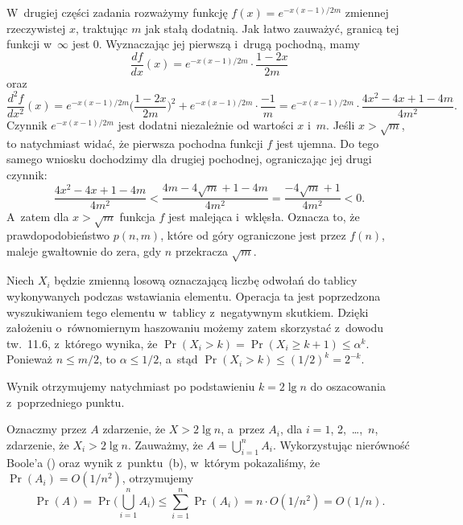 W~drugiej części zadania rozważymy funkcję $f(x)=e^{-x(x-1)/2m}$ zmiennej rzeczywistej $x$, traktując $m$ jak stałą dodatnią.
Jak łatwo zauważyć, granicą tej funkcji w~$\infty$ jest 0.
Wyznaczając jej pierwszą i~drugą pochodną, mamy
\[
	\frac{df}{dx}(x) = e^{-x(x-1)/2m}\cdot\frac{1-2x}{2m}
\]
oraz
\[
	\frac{d^2\!f}{dx^2}(x) = e^{-x(x-1)/2m}\biggl(\frac{1-2x}{2m}\biggr)^2+e^{-x(x-1)/2m}\cdot\frac{-1}{m} = e^{-x(x-1)/2m}\cdot\frac{4x^2-4x+1-4m}{4m^2}.
\]
Czynnik $e^{-x(x-1)/2m}$ jest dodatni niezależnie od wartości $x$ i~$m$.
Jeśli $x>\sqrt{m}$, to natychmiast widać, że pierwsza pochodna funkcji $f$ jest ujemna.
Do tego samego wniosku dochodzimy dla drugiej pochodnej, ograniczając jej drugi czynnik:
\[
	\frac{4x^2-4x+1-4m}{4m^2} < \frac{4m-4\sqrt{m}+1-4m}{4m^2} = \frac{-4\sqrt{m}+1}{4m^2} < 0.
\]
A~zatem dla $x>\sqrt{m}$ funkcja $f$ jest malejąca i~wklęsła.
Oznacza to, że prawdopodobieństwo $p(n,m)$, które od góry ograniczone jest przez $f(n)$, maleje gwałtownie do zera, gdy $n$ przekracza $\sqrt{m}$.

\problems


\subproblem %
Niech $X_i$ będzie zmienną losową oznaczającą liczbę odwołań do tablicy wykonywanych podczas wstawiania  elementu.
Operacja ta jest poprzedzona wyszukiwaniem tego elementu w~tablicy z~negatywnym skutkiem.
Dzięki założeniu o~równomiernym haszowaniu możemy zatem skorzystać z~dowodu tw.~11.6, z~którego wynika, że $\Pr(X_i>k)=\Pr(X_i\ge k+1)\le\alpha^k$.
Ponieważ $n\le m/2$, to $\alpha\le1/2$, a~stąd $\Pr(X_i>k)\le(1/2)^k=2^{-k}$.

\subproblem %
Wynik otrzymujemy natychmiast po podstawieniu $k=2\lg n$ do oszacowania z~poprzedniego punktu.

\subproblem %
Oznaczmy przez $A$ zdarzenie, że $X>2\lg n$, a~przez $A_i$, dla $i=1$, 2,~\dots,~$n$, zdarzenie, że $X_i>2\lg n$.
Zauważmy, że $A=\bigcup_{i=1}^nA_i$.
Wykorzystując nierówność Boole'a () oraz wynik z~punktu~(b), w~którym pokazaliśmy, że $\Pr(A_i)=O(1/n^2)$, otrzymujemy
\[
	\Pr(A) = \Pr\biggl(\bigcup_{i=1}^nA_i\biggr) \le \sum_{i=1}^n\Pr(A_i) = n\cdot O(1/n^2) = O(1/n).
\]

